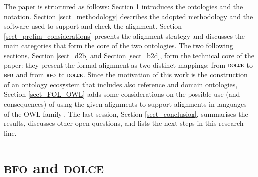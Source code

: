 \documentclass[ao]{iosart2x}
\newcommand{\nb}[1]{\textcolor{red}{$|$}\marginpar{\hspace*{-0cm}\parbox{20mm}{\scriptsize\raggedright\textcolor{red}{#1}}}}
\newcommand{\dolce}{{\textsc{dolce}}}
\newcommand{\bfo}{{\textsc{bfo}}}
\begin{document}
The paper is structured as follows: 
Section \ref{sect_bfo_and_dolce} introduces the ontologies and the notation. %
Section \ref{sect_methodology} describes the adopted methodology and the software used to support and check the alignment. 
Section \ref{sect_prelim_considerations} presents the alignment strategy and discusses the main categories that form the core of the two ontologies. 
The two following sections, Section \ref{sect_d2b} and Section \ref{sect_b2d}, form the technical core of the paper: they present the formal alignment as two distinct mappings: from $\dolce$ to $\bfo$ and from $\bfo$ to $\dolce$. 
Since the motivation of this work is the construction of an ontology ecosystem that includes also reference and domain ontologies, Section \ref{sect_FOL_OWL} adds some considerations on the possible use (and consequences) of using the given alignments to support alignments in languages of the OWL family \citep{OWL}. 
The last session, Section \ref{sect_conclusion}, summarises the results, discusses other open questions, and lists the next steps in this research line.


\section{{\bfo} and {\dolce}}
\label{sect_bfo_and_dolce}

\end{document}
